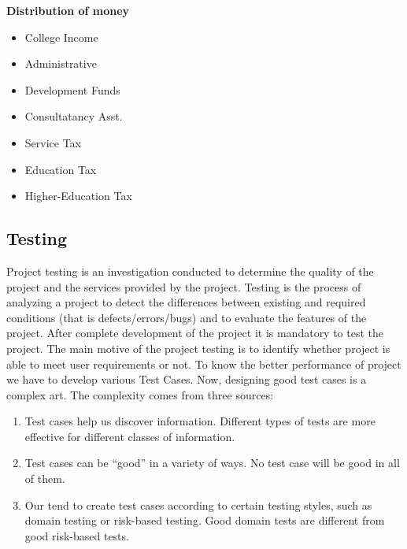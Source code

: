 \newpage
{\bf Distribution of money}\\

\begin{itemize}
\item College Income
\item Administrative
\item Development Funds
\item Consultatancy Asst.
\item Service Tax
\item Education Tax
\item Higher-Education Tax
\end{itemize}
\newpage
\subsection{Testing}
Project testing is an investigation conducted to determine the quality of the project and the services
provided by the project. Testing is the process of analyzing a project to detect the differences between
existing and required conditions (that is defects/errors/bugs) and to evaluate the features of the project.
After complete development of the project it is mandatory to test the project.
The main motive of the project testing is to identify whether project is able to meet user requirements or
not. To know the better performance of project we have to develop various Test Cases. Now, designing
good test cases is a complex art. The complexity comes from three sources:
\begin{enumerate}
\item Test cases help us discover information. Different types of tests are more effective for
different classes of information.
\item Test cases can be “good” in a variety of ways. No test case will be good in all of them.
\item Our tend to create test cases according to certain testing styles, such as domain testing or
risk-based testing. Good domain tests are different from good risk-based tests.
\end{enumerate} 
\newpage

